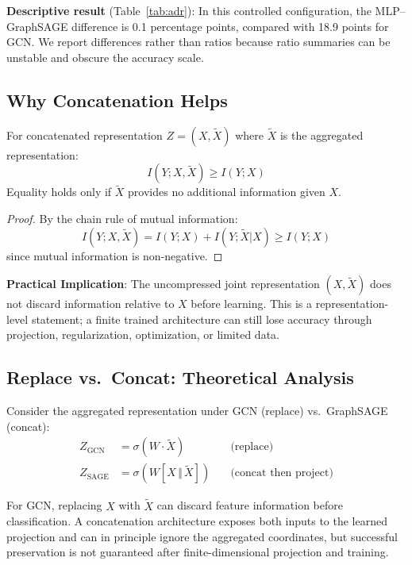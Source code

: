 \textbf{Descriptive result} (Table~\ref{tab:adr}): In this controlled configuration, the MLP--GraphSAGE difference is 0.1 percentage points, compared with 18.9 points for GCN. We report differences rather than ratios because ratio summaries can be unstable and obscure the accuracy scale.

\subsection{Why Concatenation Helps}

\begin{theorem}
\label{thm:concat}
For concatenated representation $Z = (X, \tilde{X})$ where $\tilde{X}$ is the aggregated representation:
\begin{equation}
    I(Y; X, \tilde{X}) \geq I(Y; X)
\end{equation}
Equality holds only if $\tilde{X}$ provides no additional information given $X$.
\end{theorem}

\begin{proof}
By the chain rule of mutual information:
\begin{equation}
    I(Y; X, \tilde{X}) = I(Y; X) + I(Y; \tilde{X} | X) \geq I(Y; X)
\end{equation}
since mutual information is non-negative.
\end{proof}

\textbf{Practical Implication}: The uncompressed joint representation $(X,\tilde{X})$ does not discard information relative to $X$ before learning. This is a representation-level statement; a finite trained architecture can still lose accuracy through projection, regularization, optimization, or limited data.

\subsection{Replace vs.\ Concat: Theoretical Analysis}

Consider the aggregated representation under GCN (replace) vs.\ GraphSAGE (concat):
\begin{align}
    Z_{\text{GCN}} &= \sigma(W \cdot \tilde{X}) \quad &\text{(replace)} \\
Z_{\text{SAGE}} &= \sigma\!\left(W[X\,\Vert\,\tilde{X}]\right) \quad &\text{(concat then project)}
\end{align}

For GCN, replacing $X$ with $\tilde{X}$ can discard feature information before classification. A concatenation architecture exposes both inputs to the learned projection and can in principle ignore the aggregated coordinates, but successful preservation is not guaranteed after finite-dimensional projection and training.


